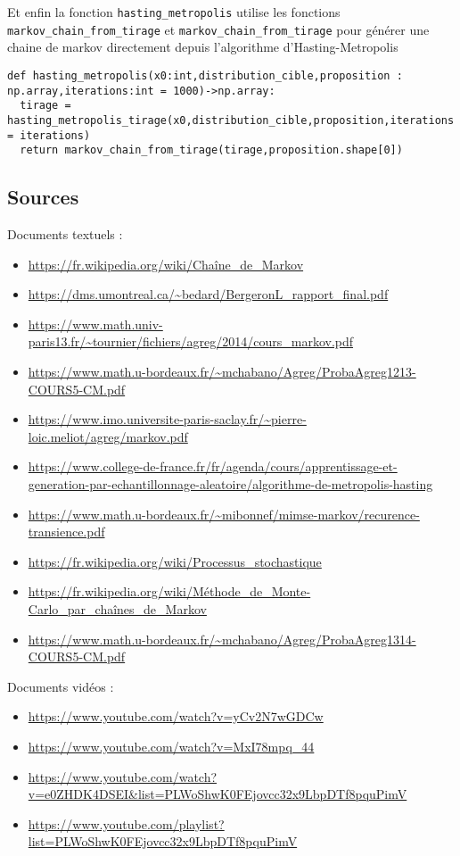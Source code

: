 \documentclass{article}
\begin{document}
Et enfin la fonction \texttt{hasting\_metropolis} utilise les fonctions \texttt{markov\_chain\_from\_tirage} et \texttt{markov\_chain\_from\_tirage} pour générer une chaine de markov directement depuis l'algorithme d'Hasting-Metropolis

\begin{verbatim}
def hasting_metropolis(x0:int,distribution_cible,proposition : np.array,iterations:int = 1000)->np.array:
  tirage = hasting_metropolis_tirage(x0,distribution_cible,proposition,iterations = iterations)
  return markov_chain_from_tirage(tirage,proposition.shape[0])
\end{verbatim}

\subsection{Sources}




Documents textuels :
\begin{itemize}
\item \url{https://fr.wikipedia.org/wiki/Chaîne_de_Markov}
\item \url{https://dms.umontreal.ca/~bedard/BergeronL_rapport_final.pdf}
\item \url{https://www.math.univ-paris13.fr/~tournier/fichiers/agreg/2014/cours_markov.pdf}
\item \url{https://www.math.u-bordeaux.fr/~mchabano/Agreg/ProbaAgreg1213-COURS5-CM.pdf}
\item \url{https://www.imo.universite-paris-saclay.fr/~pierre-loic.meliot/agreg/markov.pdf}
\item \url{https://www.college-de-france.fr/fr/agenda/cours/apprentissage-et-generation-par-echantillonnage-aleatoire/algorithme-de-metropolis-hasting}
\item \url{https://www.math.u-bordeaux.fr/~mibonnef/mimse-markov/recurence-transience.pdf}
\item \url{https://fr.wikipedia.org/wiki/Processus_stochastique}
\item \url{https://fr.wikipedia.org/wiki/Méthode_de_Monte-Carlo_par_chaînes_de_Markov}
\item \url{https://www.math.u-bordeaux.fr/~mchabano/Agreg/ProbaAgreg1314-COURS5-CM.pdf} \\
\end{itemize}

Documents vidéos :
\begin{itemize}
\item \url{https://www.youtube.com/watch?v=yCv2N7wGDCw}
\item \url{https://www.youtube.com/watch?v=MxI78mpq_44}
\item \url{https://www.youtube.com/watch?v=e0ZHDK4DSEI&list=PLWoShwK0FEjovcc32x9LbpDTf8pquPimV}
\item \url{https://www.youtube.com/playlist?list=PLWoShwK0FEjovcc32x9LbpDTf8pquPimV} \\
\end{itemize}
\end{document}
